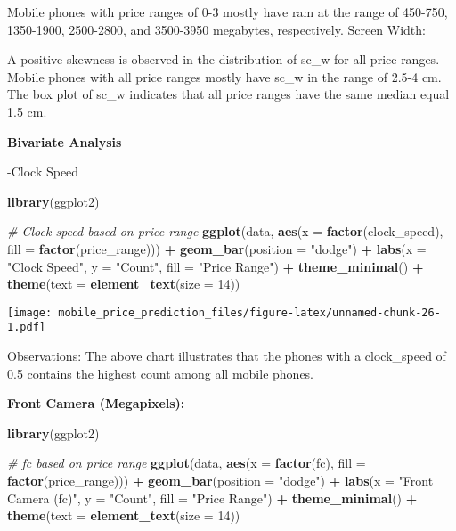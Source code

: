 \documentclass[
]{article}
\newenvironment{Shaded}{\begin{snugshade}}{\end{snugshade}}
\newcommand{\AttributeTok}[1]{\textcolor[rgb]{0.13,0.29,0.53}{#1}}
\newcommand{\CommentTok}[1]{\textcolor[rgb]{0.56,0.35,0.01}{\textit{#1}}}
\newcommand{\DecValTok}[1]{\textcolor[rgb]{0.00,0.00,0.81}{#1}}
\newcommand{\FunctionTok}[1]{\textcolor[rgb]{0.13,0.29,0.53}{\textbf{#1}}}
\newcommand{\NormalTok}[1]{#1}
\newcommand{\SpecialCharTok}[1]{\textcolor[rgb]{0.81,0.36,0.00}{\textbf{#1}}}
\newcommand{\StringTok}[1]{\textcolor[rgb]{0.31,0.60,0.02}{#1}}
\begin{document}
Mobile phones with price ranges of 0-3 mostly have ram at the range of
450-750, 1350-1900, 2500-2800, and 3500-3950 megabytes, respectively.
Screen Width:

A positive skewness is observed in the distribution of sc\_w for all
price ranges. Mobile phones with all price ranges mostly have sc\_w in
the range of 2.5-4 cm. The box plot of sc\_w indicates that all price
ranges have the same median equal 1.5 cm.

\textbf{Bivariate Analysis}

-Clock Speed

\begin{Shaded}
\begin{Highlighting}[]
\FunctionTok{library}\NormalTok{(ggplot2)}

\CommentTok{\# Clock speed based on price range}
\FunctionTok{ggplot}\NormalTok{(data, }\FunctionTok{aes}\NormalTok{(}\AttributeTok{x =} \FunctionTok{factor}\NormalTok{(clock\_speed), }\AttributeTok{fill =} \FunctionTok{factor}\NormalTok{(price\_range))) }\SpecialCharTok{+}
  \FunctionTok{geom\_bar}\NormalTok{(}\AttributeTok{position =} \StringTok{"dodge"}\NormalTok{) }\SpecialCharTok{+}
  \FunctionTok{labs}\NormalTok{(}\AttributeTok{x =} \StringTok{"Clock Speed"}\NormalTok{, }\AttributeTok{y =} \StringTok{"Count"}\NormalTok{, }\AttributeTok{fill =} \StringTok{"Price Range"}\NormalTok{) }\SpecialCharTok{+}
  \FunctionTok{theme\_minimal}\NormalTok{() }\SpecialCharTok{+}
  \FunctionTok{theme}\NormalTok{(}\AttributeTok{text =} \FunctionTok{element\_text}\NormalTok{(}\AttributeTok{size =} \DecValTok{14}\NormalTok{))}
\end{Highlighting}
\end{Shaded}

\texttt{[image: mobile\_price\_prediction\_files/figure-latex/unnamed-chunk-26-1.pdf]}

Observations: The above chart illustrates that the phones with a
clock\_speed of 0.5 contains the highest count among all mobile phones.

\textbf{Front Camera (Megapixels):}

\begin{Shaded}
\begin{Highlighting}[]
\FunctionTok{library}\NormalTok{(ggplot2)}

\CommentTok{\# fc based on price range}
\FunctionTok{ggplot}\NormalTok{(data, }\FunctionTok{aes}\NormalTok{(}\AttributeTok{x =} \FunctionTok{factor}\NormalTok{(fc), }\AttributeTok{fill =} \FunctionTok{factor}\NormalTok{(price\_range))) }\SpecialCharTok{+}
  \FunctionTok{geom\_bar}\NormalTok{(}\AttributeTok{position =} \StringTok{"dodge"}\NormalTok{) }\SpecialCharTok{+}
  \FunctionTok{labs}\NormalTok{(}\AttributeTok{x =} \StringTok{"Front Camera (fc)"}\NormalTok{, }\AttributeTok{y =} \StringTok{"Count"}\NormalTok{, }\AttributeTok{fill =} \StringTok{"Price Range"}\NormalTok{) }\SpecialCharTok{+}
  \FunctionTok{theme\_minimal}\NormalTok{() }\SpecialCharTok{+}
  \FunctionTok{theme}\NormalTok{(}\AttributeTok{text =} \FunctionTok{element\_text}\NormalTok{(}\AttributeTok{size =} \DecValTok{14}\NormalTok{))}
\end{Highlighting}
\end{Shaded}
\end{document}
